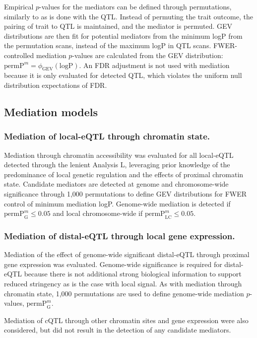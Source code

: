 \documentclass[9pt,twocolumn,twoside]{gsajnl}
\newcommand{\permpmed}{\text{permP}^{m}}
\begin{document}
Empirical $p$-values for the mediators can be defined through permutations, similarly to as is done with the QTL. Instead of permuting the trait outcome, the pairing of trait to QTL is maintained, and the mediator is permuted. GEV distributions are then fit for potential mediators from the minimum logP from the permutation scans, instead of the maximum logP in QTL scans. FWER-controlled mediation $p$-values are calculated from the GEV distribution: $\permpmed = \phi_{\text{GEV}}(\text{logP})$. An FDR adjustment is not used with mediation because it is only evaluated for detected QTL, which violates the uniform null distribution expectations of FDR.

\subsection{Mediation models}

\subsubsection{Mediation of local-eQTL through chromatin state.}
Mediation through chromatin accessibility was evaluated for all local-eQTL detected through the lenient Analysis L, leveraging prior knowledge of the predominance of local genetic regulation and the effects of proximal chromatin state. Candidate mediators are detected at genome and chromosome-wide significance through 1,000 permutations to define GEV distributions for FWER control of minimum mediation logP. Genome-wide mediation is detected if $\permpmed_{\text{G}} \leq 0.05$ and local chromosome-wide if $\permpmed_{\text{LC}} \leq 0.05$. 

\subsubsection{Mediation of distal-eQTL through local gene expression.}
Mediation of the effect of genome-wide significant distal-eQTL through proximal gene expression was evaluated. Genome-wide significance is required for distal-eQTL because there is not additional strong biological information to support reduced stringency as is the case with local signal. As with mediation through chromatin state, 1,000 permutations are used to define genome-wide mediation $p$-values, $\permpmed_{\text{G}}$. 

Mediation of cQTL through other chromatin sites and gene expression were also considered, but did not result in the detection of any candidate mediators.
\end{document}
